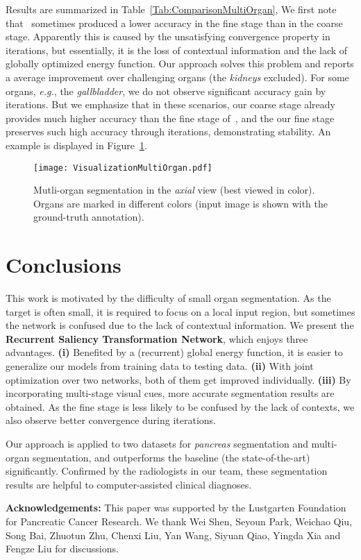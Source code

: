 \documentclass[10pt,twocolumn,letterpaper]{article}
\begin{document}
Results are summarized in Table~\ref{Tab:ComparisonMultiOrgan},
We first note that~\cite{Zhou_2017_Fixed} sometimes produced a lower accuracy in the fine stage than in the coarse stage.
Apparently this is caused by the unsatisfying convergence property in iterations,
but essentially, it is the loss of contextual information and the lack of globally optimized energy function.
Our approach solves this problem and reports a  average improvement over  challenging organs (the {\em kidneys} excluded).
For some organs, {\em e.g.}, the {\em gallbladder}, we do not observe significant accuracy gain by iterations.
But we emphasize that in these scenarios,
our coarse stage already provides much higher accuracy than the fine stage of~\cite{Zhou_2017_Fixed},
and the our fine stage preserves such high accuracy through iterations, demonstrating stability.
An example is displayed in Figure~\ref{Fig:VisualizationMultiOrgan}.

\renewcommand{\figurewidth}{8.0cm}
\begin{figure}[t]
\begin{center}
    \texttt{[image: VisualizationMultiOrgan.pdf]}
\end{center}
\caption{
    Mutli-organ segmentation in the {\em axial} view (best viewed in color).
    Organs are marked in different colors (input image is shown with the ground-truth annotation).
}
\label{Fig:VisualizationMultiOrgan}
\end{figure}


\section{Conclusions}
\label{Conclusions}

This work is motivated by the difficulty of small organ segmentation.
As the target is often small, it is required to focus on a local input region,
but sometimes the network is confused due to the lack of contextual information.
We present the {\bf Recurrent Saliency Transformation Network}, which enjoys three advantages.
{\bf (i)} Benefited by a (recurrent) global energy function, it is easier to generalize our models from training data to testing data.
{\bf (ii)} With joint optimization over two networks, both of them get improved individually.
{\bf (iii)} By incorporating multi-stage visual cues, more accurate segmentation results are obtained.
As the fine stage is less likely to be confused by the lack of contexts, we also observe better convergence during iterations.

Our approach is applied to two datasets for {\em pancreas} segmentation and multi-organ segmentation,
and outperforms the baseline (the state-of-the-art) significantly.
Confirmed by the radiologists in our team, these segmentation results are helpful to computer-assisted clinical diagnoses.


\vspace{0.2cm}
\noindent
{\bf Acknowledgements:}
This paper was supported by the Lustgarten Foundation for Pancreatic Cancer Research.
We thank Wei Shen, Seyoun Park, Weichao Qiu,
Song Bai, Zhuotun Zhu, Chenxi Liu, Yan Wang, Siyuan Qiao, Yingda Xia and Fengze Liu for discussions.


{\small


}
\end{document}
